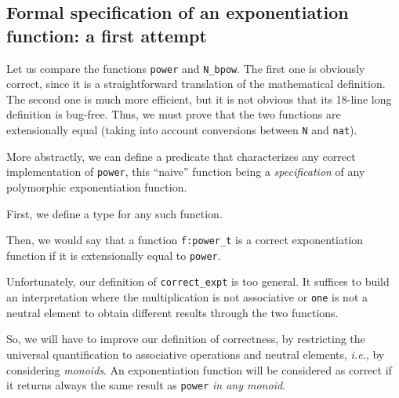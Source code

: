 




\subsection{Formal specification of an exponentiation function: a first attempt}

Let us compare the functions \texttt{power} and \texttt{N\_bpow}.
The first one is obviously correct, since it is a straightforward translation of the mathematical definition.
The second one is much more efficient, but it is not obvious  that its 18-line long definition is bug-free.
Thus, we must prove that the two functions are extensionally equal (taking into account conversions
between \texttt{N} and \texttt{nat}).

More abstractly, we can define a predicate that characterizes any correct implementation 
of \texttt{power}, this ``naive''  function being a \emph{specification} of any polymorphic
exponentiation function.

First, we define a type for any such function.


Then, we would say that a function \texttt{f:power\_t} is a correct exponentiation function if it
is extensionally equal to \texttt{power}.


Unfortunately, our definition of \texttt{correct\_expt} is too general. It suffices to build 
an interpretation where the multiplication is not associative or \texttt{one} is not a neutral
element to obtain different results through the two functions.




So, we will have to improve our definition of correctness, by restricting  the universal quantification to associative operations and neutral elements, \emph{i.e.}, by considering \emph{monoids}.
An exponentiation  function will be considered as correct if it returns always the same result as \texttt{power} \emph{in any monoid}.



